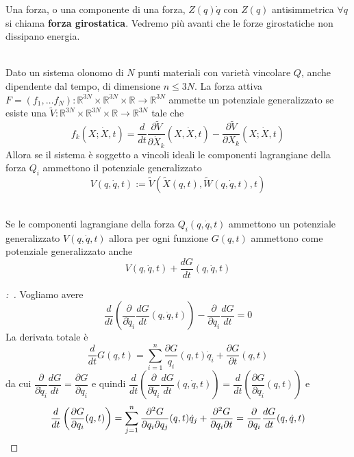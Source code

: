 \documentclass[11pt,a4paper,twoside]{book}
\newenvironment{proposizione}[1][\empty]{\begin{Proposizione}{
\ifx\empty#1\relax\else\mdseries\itshape#1\\\fi
}{}}{\end{Proposizione}}
\newenvironment{dimo}[1][\proofname]{
	\begin{tcolorbox}[
	breakable, 
	enhanced, 
	interior hidden, 
	frame hidden, 
	borderline west = {1pt}{0pt}{gray}, 
	top=0pt, bottom=0pt, left=0pt]
\begin{proof}[#1:~]
}
{
\end{proof}
\end{tcolorbox}
}
\theoremstyle{esss}
\theoremstyle{dotless}
\numberwithin{equation}{section} %
\begin{document}
Una forza, o una componente di una forza, $Z(q)\dot{q}$ con $Z(q)$ antisimmetrica $\forall q$ si chiama \textbf{forza girostatica}. Vedremo più avanti che le forze girostatiche non dissipano energia.

\begin{proposizione}
Dato un sistema olonomo di $N$ punti materiali con varietà vincolare $Q$, anche dipendente dal tempo, di dimensione $n\leq 3N$.
La forza attiva $F=(f_1,\dots f_N):\mathbb{R}^{3N}\times\mathbb{R}^{3N}\times\mathbb{R}\rightarrow\mathbb{R}^{3N}$ ammette un potenziale generalizzato se esiste una $\tilde{V}:\mathbb{R}^{3N}\times\mathbb{R}^{3N}\times\mathbb{R}\rightarrow\mathbb{R}^{3N}$ tale che
\[ f_k(X;\dot{X},t)= \dfrac{d}{dt}\dfrac{\partial \tilde{V}}{\partial \dot{X}_k} (X,\dot{X},t) - \dfrac{\partial \tilde{V}}{\partial X_k}(X;\dot{X},t)
\]
Allora se il sistema è soggetto a vincoli ideali le componenti lagrangiane della forza $Q_i$ ammettono il potenziale generalizzato
\[
V(q,\dot{q},t):=\tilde{V}(\tilde{X}(q,t),\tilde{W}(q,\dot{q},t),t)
\]
\end{proposizione}

\begin{proposizione}
Se le componenti lagrangiane della forza $Q_i(q,\dot{q},t)$ ammettono un potenziale generalizzato $V(q,\dot{q},t)$ allora per ogni funzione $G(q,t)$ ammettono come potenziale generalizzato anche
\[ V(q,\dot{q},t)+\dfrac{dG}{dt}(q,\dot{q},t)\]
\end{proposizione}
\begin{dimo}
Vogliamo avere
\[
\dfrac{d}{dt}\left(\dfrac{\partial}{\partial \dot{q}_i}\dfrac{dG}{dt}(q,\dot{q},t) \right) - \dfrac{\partial}{\partial q_i}\dfrac{dG}{dt}=0
\]
La derivata totale è
\[
\dfrac{d}{dt}G(q,t)=\sum_{i=1}^n \dfrac {\partial G}{q_i}(q,t) \dot{q}_i + \dfrac{\partial G}{\partial t}(q,t) 
\]
da cui $\dfrac{\partial}{\partial \dot{q}_i}\dfrac{d G}{dt}=\dfrac{\partial G}{\partial q_i}$ e quindi
$ \dfrac{d}{dt}\left(\dfrac{\partial}{\partial \dot{q}_i}\dfrac{dG}{dt}(q,\dot{q},t) \right)=
\dfrac{d}{dt}\left( \dfrac{\partial G}{\partial q_i} (q,t) \right)$ e
\[
\dfrac{d}{dt}\left( \dfrac{\partial G}{\partial q_i} (q,t) \right)=
\sum_{j=1}^n \dfrac{\partial^2 G}{\partial q_i\partial q_j}(q,t)\dot{q}_j+\dfrac{\partial^2 G}{\partial q_i\partial t}=\dfrac{\partial}{\partial q_i}\dfrac{dG}{dt}(q,\dot{q},t) \qedhere
\]
\end{dimo}
\end{document}

